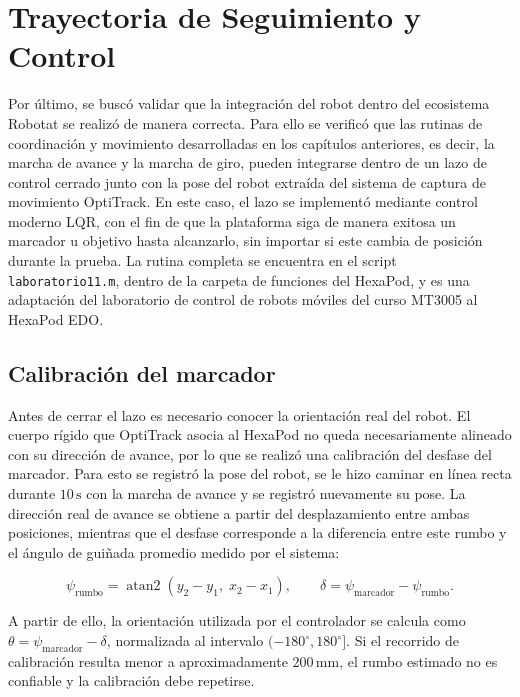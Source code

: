 \chapter{Trayectoria de Seguimiento y Control}

Por último, se buscó validar que la integración del robot dentro del ecosistema Robotat se realizó de manera correcta. Para ello se verificó que las rutinas de coordinación y movimiento desarrolladas en los capítulos anteriores, es decir, la marcha de avance y la marcha de giro, pueden integrarse dentro de un lazo de control cerrado junto con la pose del robot extraída del sistema de captura de movimiento OptiTrack. En este caso, el lazo se implementó mediante control moderno LQR, con el fin de que la plataforma siga de manera exitosa un marcador u objetivo hasta alcanzarlo, sin importar si este cambia de posición durante la prueba. La rutina completa se encuentra en el script \texttt{laboratorio11.m}, dentro de la carpeta de funciones del HexaPod, y es una adaptación del laboratorio de control de robots móviles del curso MT3005 al HexaPod EDO.

\section{Calibración del marcador}

Antes de cerrar el lazo es necesario conocer la orientación real del robot. El cuerpo rígido que OptiTrack asocia al HexaPod no queda necesariamente alineado con su dirección de avance, por lo que se realizó una calibración del desfase del marcador. Para esto se registró la pose del robot, se le hizo caminar en línea recta durante $10\,\text{s}$ con la marcha de avance y se registró nuevamente su pose. La dirección real de avance se obtiene a partir del desplazamiento entre ambas posiciones, mientras que el desfase corresponde a la diferencia entre este rumbo y el ángulo de guiñada promedio medido por el sistema:

\begin{equation}
\psi_{\text{rumbo}} = \operatorname{atan2}\left(y_2 - y_1,\; x_2 - x_1\right), \qquad
\delta = \psi_{\text{marcador}} - \psi_{\text{rumbo}}.
\end{equation}

A partir de ello, la orientación utilizada por el controlador se calcula como $\theta = \psi_{\text{marcador}} - \delta$, normalizada al intervalo $(-180^\circ, 180^\circ]$. Si el recorrido de calibración resulta menor a aproximadamente $200\,\text{mm}$, el rumbo estimado no es confiable y la calibración debe repetirse.

